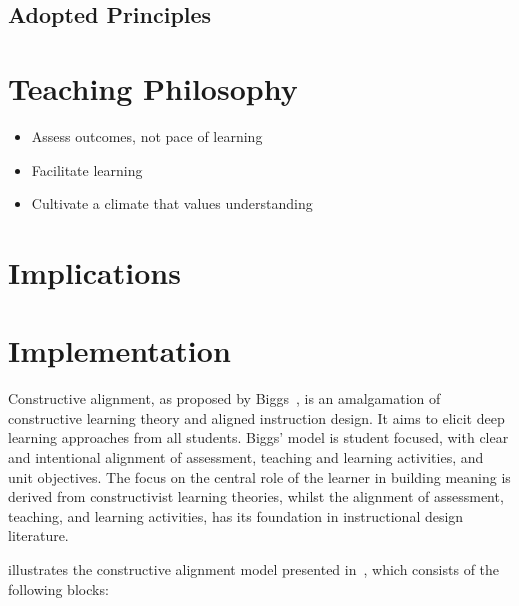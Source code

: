 

\subsection{Adopted Principles} %
\label{sub:adopted_principles}






\section{Teaching Philosophy} %
\label{sec:teaching_philosophy}

\begin{itemize}
	\item Assess outcomes, not pace of learning
	\item Facilitate learning 
	\item Cultivate a climate that values understanding
\end{itemize}




\section{Implications} %
\label{sec:implications}


\section{Implementation} %
\label{sec:design}

Constructive alignment, as proposed by Biggs~\cite{Biggs:1996c}, is an amalgamation of constructive learning theory and aligned instruction design. It aims to elicit deep learning approaches from all students. Biggs' model is student focused, with clear and intentional alignment of assessment, teaching and learning activities, and unit objectives. The focus on the central role of the learner in building meaning is derived from constructivist learning theories, whilst the alignment of assessment, teaching, and learning activities, has its foundation in instructional design literature. 

 illustrates the constructive alignment model presented in~\cite{Houghton:2004}, which consists of the following blocks:

